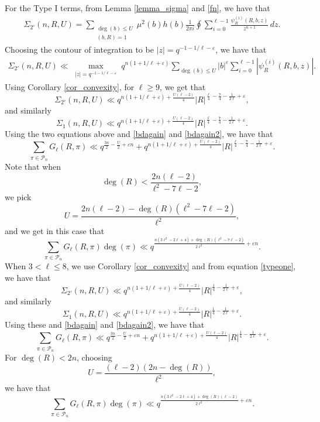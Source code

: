 \documentclass[12pt]{amsart}
\begin{document}
For the Type I terms, from Lemma \ref{lemma_sigma} and \eqref{fn}, we have that
\begin{align*}
\Sigma_{2'}(n,R,U) = \sum_{\substack{ \deg(b) \leq U \\ (b,R)=1}} \mu^2(b) h(b) \frac{1}{2  \pi i} \oint \sum_{i=0}^{\ell-1} \frac{ \psi_R^{(i)}(R,b,z)}{z^{n+1}} \, dz.
\end{align*}
Choosing the contour of integration to be $|z|=q^{-1-1/\ell-\varepsilon}$, we have that
\begin{align}  
\label{typeone}
\Sigma_{2'}(n,R,U) \ll \max_{\substack{|z|=q^{-1-1/\ell-\varepsilon}}} q^{n(1+1/\ell+\varepsilon)} \sum_{\deg(b) \leq U} |b|^{\varepsilon} \sum_{i=0}^{\ell-1} |\psi_R^{(i)}(R,b,z)|.
\end{align}
 Using Corollary \ref{cor_convexity}, for $\ell \geq 9$, we get that
$$ \Sigma_{2'}(n,R,U) \ll q^{n(1+1/\ell+\varepsilon)+ \frac{U(\ell-2)}{4}} |R|^{\frac{\ell}{4}-\frac{7}{4}-\frac{1}{2\ell}+\varepsilon},$$
and similarly
$$ \Sigma_{1}(n,R,U) \ll q^{n(1+1/\ell+\varepsilon)+ \frac{U(\ell-2)}{4}} |R|^{\frac{\ell}{4}-\frac{7}{4}-\frac{1}{2\ell}+\varepsilon}.$$
Using the two equations above and \eqref{bdagain} and \eqref{bdagain2}, we have that 
\begin{equation*}
\sum_{\pi \in \mathcal{P}_n} G_{\ell}(R,\pi) \ll q^{\frac{3n}{2}-\frac{U}{2}+\varepsilon n }+ q^{n(1+1/\ell+\varepsilon)+ \frac{U(\ell-2)}{4}} |R|^{\frac{\ell}{4}-\frac{7}{4}-\frac{1}{2\ell}+\varepsilon}.
\end{equation*}
Note that when 
$$ \deg(R) < \frac{2n(\ell-2)}{\ell^2-7\ell-2},$$ we pick
$$U = \frac{2n(\ell-2) - \deg(R)(\ell^2-7\ell-2)}{\ell^2}, $$ and we get in this case that
\begin{equation} 
\label{firstbound}
\sum_{\pi \in \mathcal{P}_n} G_{\ell}(R,\pi) \deg(\pi) \ll q^{\frac{n(3\ell^2-2\ell+4)+\deg(R)(\ell^2-7\ell-2)}{2\ell^2}+\varepsilon n }.
\end{equation}
When $3 < \ell \leq 8$, we use Corollary \ref{cor_convexity} and from equation \eqref{typeone}, we have that 
$$\Sigma_{2'}(n,R,U) \ll q^{n(1+1/\ell+\varepsilon)+ \frac{U(\ell-2)}{4}} |R|^{\frac{1}{4}-\frac{1}{2\ell}+\varepsilon},
$$ and similarly 
$$\Sigma_1(n,R,U) \ll q^{n(1+1/\ell+\varepsilon)+ \frac{U(\ell-2)}{4}}|R|^{\frac{1}{4}-\frac{1}{2\ell}+\varepsilon}.$$
Using these and \eqref{bdagain} and \eqref{bdagain2}, we have that
$$ \sum_{\pi \in \mathcal{P}_n} G_{\ell}(R,\pi) \ll q^{\frac{3n}{2}-\frac{U}{2}+\varepsilon n } + q^{n(1+1/\ell+\varepsilon)+ \frac{U(\ell-2)}{4}}|R|^{\frac{1}{4}-\frac{1}{2\ell}+\varepsilon}.$$
For $\deg(R) <2n$, choosing 
$$U = \frac{(\ell-2)(2n-\deg(R))}{\ell^2},$$ 
we have that 
\begin{equation} 
\label{secondbound}
\sum_{\pi \in \mathcal{P}_n} G_{\ell}(R,\pi) \deg(\pi) \ll q^{\frac{n(3\ell^2-2\ell+4)+\deg(R)(\ell-2)}{2\ell^2}+\varepsilon n}.
\end{equation}
\end{document}
